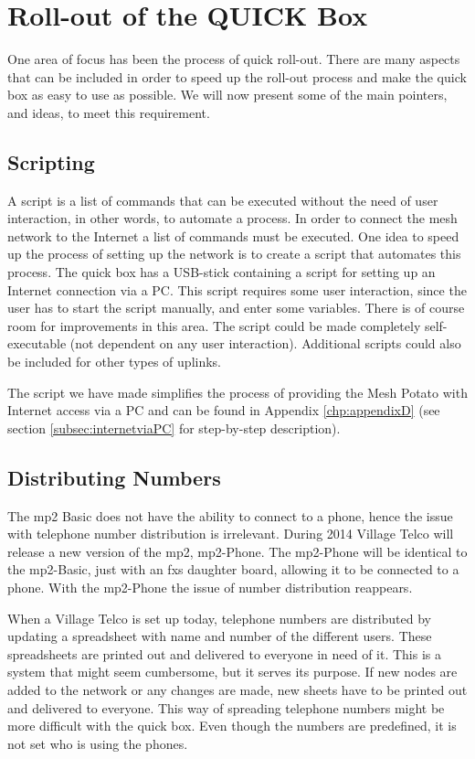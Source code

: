 \chapter{Roll-out of the QUICK Box}
\label{chp:manuals} 

One area of focus has been the process of quick roll-out. There are many aspects that can be included in order to speed up the roll-out process and make the \gls{quick} box as easy to use as possible. We will now present some of the main pointers, and ideas, to meet this requirement.


\section{Scripting}
A script is a list of commands that can be executed without the need of user interaction, in other words, to automate a process. In order to connect the mesh network to the Internet a list of commands must be executed. One idea to speed up the process of setting up the network is to create a script that automates this process. The \gls{quick} box has a USB-stick containing a script for setting up an Internet connection via a PC. This script requires some user interaction, since the user has to start the script manually, and enter some variables. There is of course room for improvements in this area. The script could be made completely self-executable (not dependent on any user interaction). Additional scripts could also be included for other types of uplinks. 

The script we have made simplifies the process of providing the Mesh Potato with Internet access via a PC and can be found in Appendix \ref{chp:appendixD} (see section \ref{subsec:internetviaPC} for step-by-step description). 

\section{Distributing Numbers}
The \gls{mp2} Basic does not have the ability to connect to a phone, hence the issue with telephone number distribution is irrelevant. During 2014 Village Telco will release a new version of the \gls{mp2}, \gls{mp2}-Phone. The \gls{mp2}-Phone will be identical to the \gls{mp2}-Basic, just with an \gls{fxs} daughter board, allowing it to be connected to a phone. With the \gls{mp2}-Phone the issue of number distribution reappears. 

When a Village Telco is set up today, telephone numbers are distributed by updating a spreadsheet with name and number of the different users. These spreadsheets are printed out and delivered to everyone in need of it. This is a system that might seem cumbersome, but it serves its purpose. If new nodes are added to the network or any changes are made, new sheets have to be printed out and delivered to everyone. This way of spreading telephone numbers might be more difficult with the \gls{quick} box. Even though the numbers are predefined, it is not set who is using the phones.  

